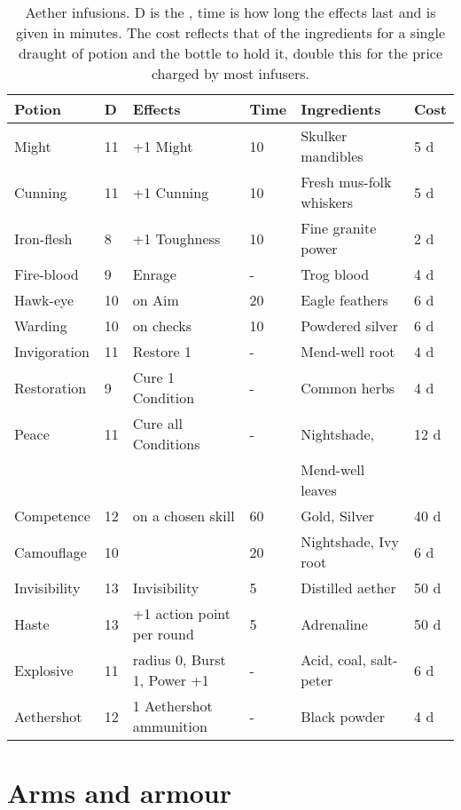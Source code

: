 \documentclass[a4paper,11pt,oneside]{book}
\newcommand{\textlf}[1]{\textbf{\titlecap{#1}}}
\begin{document}
\begin{table}[ht!]
\caption{Aether infusions. D is the \textlf{difficulty}, time is how long the effects last and is given in minutes. The cost reflects that of the ingredients for a single draught of potion and the bottle to hold it, double this for the price charged by most infusers.}
\begin{tabular}{|l|l|l|l|l|l|}
\hline
Potion & D & Effects & Time & Ingredients & Cost \\
\hline
Might &  11 & +1 Might & 10 & Skulker mandibles & 5 d \\
Cunning & 11 & +1 Cunning & 10 & Fresh mus-folk whiskers & 5 d \\
Iron-flesh & 8 & +1 Toughness & 10 & Fine granite power & 2 d \\
Fire-blood & 9 & Enrage & - & Trog blood & 4 d \\
Hawk-eye & 10 & \textlf{edge+} on Aim & 20 & Eagle feathers & 6 d \\
Warding & 10 & \textlf{edge+} on \textlf{resist} checks & 10 & Powdered silver & 6 d \\ 
Invigoration & 11 & Restore 1 \textlf{endurance} & - & Mend-well root & 4 d \\
Restoration & 9 & Cure 1 Condition & - & Common herbs & 4 d \\
Peace & 11 & Cure all Conditions & - & Nightshade,  & 12 d \\
 & & & & Mend-well leaves & \\
Competence & 12 & \textlf{edge+} on a chosen skill & 60 & Gold, Silver & 40 d \\
Camouflage & 10 & \textlf{Stealth edge+} & 20 & Nightshade, Ivy root & 6 d \\
Invisibility & 13 & Invisibility & 5 & Distilled aether & 50 d \\
Haste & 13 & +1 action point per round & 5 & Adrenaline & 50 d \\ 
Explosive & 11 & radius 0, Burst 1, Power +1 & - & Acid, coal, salt-peter & 6 d \\
Aethershot & 12 & 1 Aethershot ammunition & - & Black powder & 4 d \\ 
\hline
\end{tabular}
\label{tab:alch}
\end{table}




\chapter{Arms and armour}
\label{chap:arms}
\end{document}

